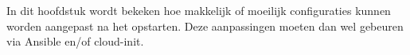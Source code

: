 \chapter{}
\label{ch:naopstarten}
In dit hoofdstuk wordt bekeken hoe makkelijk of moeilijk configuraties kunnen worden aangepast na het opstarten. Deze aanpassingen moeten dan wel gebeuren via Ansible en/of cloud-init.

